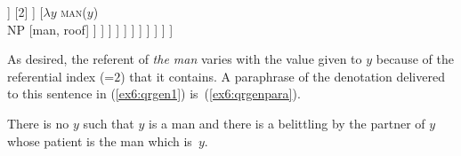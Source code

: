 \begin{fullwidth}
\begin{exe}
\begin{forest}
							[$\lambda i\ \lambda P$ \rotiota $a$ $a${=}$i$ $\wedge$ $P(a)$ \\\obar{D} [$\surd$the]]
							[2]
							]
								[$\lambda y$ \textsc{man}($y$)\\NP [man, roof] ]
							] ]
						] ]
					] ]
				 ]
			 ]
		]
	]
\end{forest}%
%
%
%
\end{exe}	
\end{fullwidth}
\vspace*{-50pt}
As desired, the referent of \emph{the man} varies with the value given to $y$ because of the referential index (=$2$) that it contains. A paraphrase of the denotation delivered to this sentence in (\ref{ex6:qrgen1}) is~(\ref{ex6:qrgenpara}).
\begin{exe}
\raggedright
	\ex \label{ex6:qrgenpara}
	There is no $y$ such that $y$ is a man and there is a belittling by the partner of $y$ whose patient is the man which is~$y$.
\end{exe}

